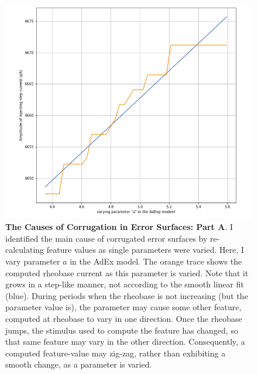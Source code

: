 \begin{figure}
\begin{center}
\includegraphics[]{figures/fundamental_cause_of_corrogations.png}
\caption[Causes of corrugation (1)]{\textbf{The Causes of Corrugation in Error Surfaces: Part A}.
I identified the main cause of corrugated error surfaces by re-calculating feature values as single parameters were varied.
Here, I vary parameter $a$ in the AdEx model.
The orange trace shows the computed rheobase current as this parameter is varied.
Note that it grows in a step-like manner, not according to the smooth linear fit (blue).
During periods when the rheobase is not increasing (but the parameter value is), the parameter may cause some other feature, computed at rheobase to vary in one direction.
Once the rheobase jumps, the stimulus used to compute the feature has changed, so that same feature may vary in the other direction.
Consequently, a computed feature-value may zig-zag, rather than exhibiting a smooth change, as a parameter is varied.}
\label{fig:corrugation-cause-1}
\end{center}
\end{figure}

